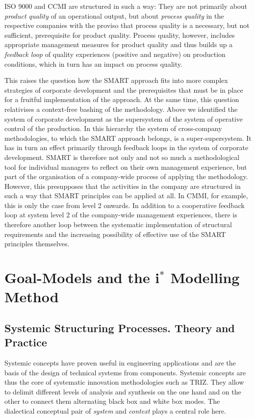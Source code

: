 \documentclass[11pt,a4paper]{article}
\begin{document}
ISO 9000 and CCMI are structured in such a way: They are not primarily about
\emph{product quality} of an operational output, but about \emph{process
  quality} in the respective companies with the proviso that process quality
is a necessary, but not sufficient, prerequisite for product quality. Process
quality, however, includes appropriate management measures for product quality
and thus builds up a \emph{feedback loop} of quality experiences (positive and
negative) on production conditions, which in turn has an impact on process
quality.

This raises the question how the SMART approach fits into more complex
strategies of corporate development and the prerequisites that must be in
place for a fruitful implementation of the approach. At the same time, this
question relativises a context-free bashing of the methodology. Above we
identified the system of corporate development as the supersystem of the
system of operative control of the production. In this hierarchy the system of
cross-company methodologies, to which the SMART approach belongs, is a
super-supersystem. It has in turn an effect primarily through feedback loops
in the system of corporate development. SMART is therefore not only and not so
much a methodological tool for individual managers to reflect on their own
management experience, but part of the organisation of a company-wide process
of applying the methodology. However, this presupposes that the activities in
the company are structured in such a way that SMART principles can be applied
at all. In CMMI, for example, this is only the case from level 2 onwards. In
addition to a cooperative feedback loop at system level 2 of the company-wide
management experiences, there is therefore another loop between the systematic
implementation of structural requirements and the increasing possibility of
effective use of the SMART principles themselves.

\section{Goal-Models and the i$^\ast$ Modelling Method}

\subsection{Systemic Structuring Processes. Theory and Practice}

Systemic concepts have proven useful in engineering applications and are the
basis of the design of technical systems from components. Systemic concepts
are thus the core of systematic innovation methodologies such as TRIZ. They
allow to delimit different levels of analysis and synthesis on the one hand
and on the other to connect them alternating black box and white box modes.
The dialectical conceptual pair of \emph{system} and \emph{context} plays a
central role here.
\end{document}
